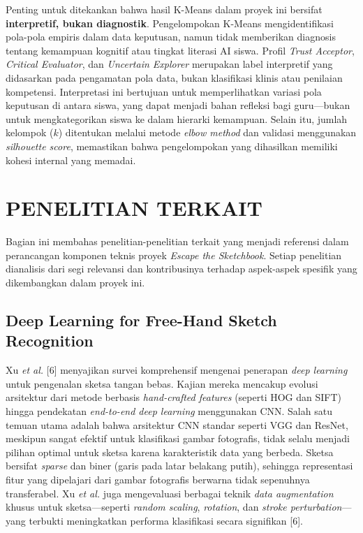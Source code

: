 \documentclass[12pt,oneside]{report}
\begin{document}
Penting untuk ditekankan bahwa hasil K-Means dalam proyek ini bersifat \textbf{interpretif, bukan diagnostik}. Pengelompokan K-Means mengidentifikasi pola-pola empiris dalam data keputusan, namun tidak memberikan diagnosis tentang kemampuan kognitif atau tingkat literasi AI siswa. Profil \textit{Trust Acceptor}, \textit{Critical Evaluator}, dan \textit{Uncertain Explorer} merupakan label interpretif yang didasarkan pada pengamatan pola data, bukan klasifikasi klinis atau penilaian kompetensi. Interpretasi ini bertujuan untuk memperlihatkan variasi pola keputusan di antara siswa, yang dapat menjadi bahan refleksi bagi guru—bukan untuk mengkategorikan siswa ke dalam hierarki kemampuan. Selain itu, jumlah kelompok ($k$) ditentukan melalui metode \textit{elbow method} dan validasi menggunakan \textit{silhouette score}, memastikan bahwa pengelompokan yang dihasilkan memiliki kohesi internal yang memadai.

\section{PENELITIAN TERKAIT}
\label{sec:penelitian-terkait}

Bagian ini membahas penelitian-penelitian terkait yang menjadi referensi dalam perancangan komponen teknis proyek \textit{Escape the Sketchbook}. Setiap penelitian dianalisis dari segi relevansi dan kontribusinya terhadap aspek-aspek spesifik yang dikembangkan dalam proyek ini.

\subsection{Deep Learning for Free-Hand Sketch Recognition}
\label{subsec:penelitian-sketch}

Xu \textit{et al.} [6] menyajikan survei komprehensif mengenai penerapan \textit{deep learning} untuk pengenalan sketsa tangan bebas. Kajian mereka mencakup evolusi arsitektur dari metode berbasis \textit{hand-crafted features} (seperti HOG dan SIFT) hingga pendekatan \textit{end-to-end deep learning} menggunakan CNN. Salah satu temuan utama adalah bahwa arsitektur CNN standar seperti VGG dan ResNet, meskipun sangat efektif untuk klasifikasi gambar fotografis, tidak selalu menjadi pilihan optimal untuk sketsa karena karakteristik data yang berbeda. Sketsa bersifat \textit{sparse} dan biner (garis pada latar belakang putih), sehingga representasi fitur yang dipelajari dari gambar fotografis berwarna tidak sepenuhnya transferabel. Xu \textit{et al.} juga mengevaluasi berbagai teknik \textit{data augmentation} khusus untuk sketsa—seperti \textit{random scaling}, \textit{rotation}, dan \textit{stroke perturbation}—yang terbukti meningkatkan performa klasifikasi secara signifikan [6].
\end{document}
